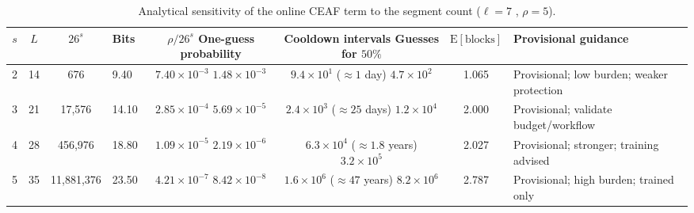 \documentclass[cmc,article,submit,moreauthors,pdftex]{Definitions/tsp}
\renewcommand{\mathbb}[1]{\mathrm{#1}}
\providecommand{\DIFadd}[1]{{\protect\color{blue} \sf #1}} %
\providecommand{\DIFdel}[1]{{\protect\color{red} \scriptsize #1}} %
\providecommand{\DIFaddFL}[1]{\DIFadd{#1}} %
\providecommand{\DIFdelFL}[1]{\DIFdel{#1}} %
\providecommand{\DIFaddbeginFL}{} %
\providecommand{\DIFaddendFL}{} %
\providecommand{\DIFdelbeginFL}{} %
\providecommand{\DIFdelendFL}{} %
\begin{document}
\begin{table}[t]
\caption{Analytical sensitivity of the online CEAF term to the segment count ($\ell=7$\DIFdelbeginFL \DIFdelFL{, $\rho=5$}\DIFdelendFL ).\label{tab:sens}}
\DIFdelbeginFL %
\DIFdelendFL \DIFaddbeginFL \begin{tabularx}{\textwidth}{cccXccc>{\raggedright\arraybackslash}X}
\DIFaddendFL \toprule
\boldmath$s$ & \boldmath$L$ & \boldmath$26^{s}$ & \textbf{Bits} & \DIFdelbeginFL %
\DIFdelFL{$\rho/26^{s}$ }\DIFdelendFL \DIFaddbeginFL \DIFaddFL{\textbf{One-guess probability} }\DIFaddendFL & \textbf{\DIFdelbeginFL \DIFdelFL{Cooldown intervals }\DIFdelendFL \DIFaddbeginFL \DIFaddFL{Guesses }\DIFaddendFL for $50\%$} & \boldmath$\mathbb{E}[\text{blocks}]$ \DIFaddbeginFL & \DIFaddFL{\textbf{Provisional guidance}}\DIFaddendFL \\
\midrule
2 & 14 & 676 & 9.40 & \DIFdelbeginFL \DIFdelFL{$7.40\times10^{-3}$ }\DIFdelendFL \DIFaddbeginFL \DIFaddFL{$1.48\times10^{-3}$ }\DIFaddendFL & \DIFdelbeginFL \DIFdelFL{$9.4\times10^{1}$ ($\approx1$ day) }\DIFdelendFL \DIFaddbeginFL \DIFaddFL{$4.7\times10^{2}$ }\DIFaddendFL & 1.065 \DIFaddbeginFL & \DIFaddFL{Provisional; low burden; weaker protection}\DIFaddendFL \\
3 & 21 & 17{,}576 & 14.10 & \DIFdelbeginFL \DIFdelFL{$2.85\times10^{-4}$ }\DIFdelendFL \DIFaddbeginFL \DIFaddFL{$5.69\times10^{-5}$ }\DIFaddendFL & \DIFdelbeginFL \DIFdelFL{$2.4\times10^{3}$ ($\approx25$ days) }\DIFdelendFL \DIFaddbeginFL \DIFaddFL{$1.2\times10^{4}$ }\DIFaddendFL & 2.000 \DIFaddbeginFL & \DIFaddFL{Provisional; validate budget/workflow}\DIFaddendFL \\
4 & 28 & 456{,}976 & 18.80 & \DIFdelbeginFL \DIFdelFL{$1.09\times10^{-5}$ }\DIFdelendFL \DIFaddbeginFL \DIFaddFL{$2.19\times10^{-6}$ }\DIFaddendFL & \DIFdelbeginFL \DIFdelFL{$6.3\times10^{4}$ ($\approx1.8$ years) }\DIFdelendFL \DIFaddbeginFL \DIFaddFL{$3.2\times10^{5}$ }\DIFaddendFL & 2.027 \DIFaddbeginFL & \DIFaddFL{Provisional; stronger; training advised}\DIFaddendFL \\
5 & 35 & 11{,}881{,}376 & 23.50 & \DIFdelbeginFL \DIFdelFL{$4.21\times10^{-7}$ }\DIFdelendFL \DIFaddbeginFL \DIFaddFL{$8.42\times10^{-8}$ }\DIFaddendFL & \DIFdelbeginFL \DIFdelFL{$1.6\times10^{6}$ ($\approx47$ years) }\DIFdelendFL \DIFaddbeginFL \DIFaddFL{$8.2\times10^{6}$ }\DIFaddendFL & 2.787 \DIFaddbeginFL & \DIFaddFL{Provisional; high burden; trained only}\DIFaddendFL \\

\end{tabularx}
\end{table}
\end{document}
